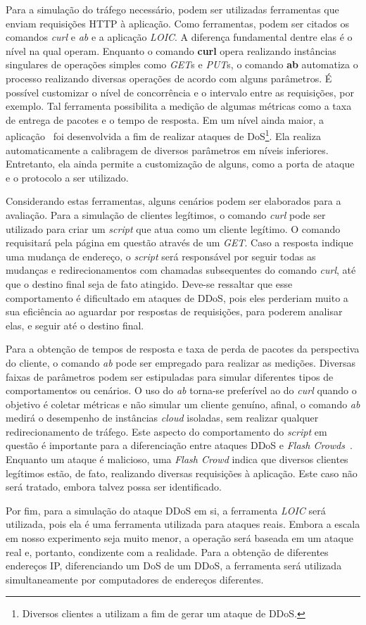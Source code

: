 
Para a simulação do tráfego necessário, podem ser utilizadas ferramentas que enviam requisições HTTP à aplicação. Como ferramentas, podem ser citados os comandos \emph{curl} e \emph{ab} e a aplicação \emph{LOIC}. A diferença fundamental dentre elas é o nível na qual operam. Enquanto o comando \textbf{curl} opera realizando instâncias singulares de operações simples como \emph{GET}s e \emph{PUT}s, o comando \textbf{ab} automatiza o processo realizando diversas operações de acordo com alguns parâmetros. É possível customizar o nível de concorrência e o intervalo entre as requisições, por exemplo. Tal ferramenta possibilita a medição de algumas métricas como a taxa de entrega de pacotes e o tempo de resposta. Em um nível ainda maior, a aplicação~\cite{loic} foi desenvolvida a fim de realizar ataques de DoS\footnote{Diversos clientes a utilizam a fim de gerar um ataque de DDoS.}. Ela realiza automaticamente a calibragem de diversos parâmetros em níveis inferiores. Entretanto, ela ainda permite a customização de alguns, como a porta de ataque e o protocolo a ser utilizado.

Considerando estas ferramentas, alguns cenários podem ser elaborados para a avaliação. 
%
Para a simulação de clientes legítimos, o comando \emph{curl} pode ser utilizado para criar um \emph{script} que atua como um cliente legítimo. O comando requisitará pela página em questão através de um \emph{GET}. Caso a resposta indique uma mudança de endereço, o \emph{script} será responsável por seguir todas as mudanças e redirecionamentos com chamadas subsequentes do comando \emph{curl}, até que o destino final seja de fato atingido. Deve-se ressaltar que esse comportamento é dificultado em ataques de DDoS, pois eles perderiam muito a sua eficiência ao aguardar por respostas de requisições, para poderem analisar elas, e seguir até o destino final.

Para a obtenção de tempos de resposta e taxa de perda de pacotes da perspectiva do cliente, o comando \emph{ab} pode ser empregado para realizar as medições. Diversas faixas de parâmetros podem ser estipuladas para simular diferentes tipos de comportamentos ou cenários. O uso do \emph{ab} torna-se preferível ao do \emph{curl} quando o objetivo é coletar métricas e não simular um cliente genuíno, afinal, o comando \emph{ab} medirá o desempenho de instâncias \emph{cloud} isoladas, sem realizar qualquer redirecionamento de tráfego. Este aspecto do comportamento do \emph{script} em questão é importante para a diferenciação entre ataques DDoS e \emph{Flash Crowds}~\cite{Thapngam:2011p27061}. Enquanto um ataque é malicioso, uma \emph{Flash Crowd} indica que diversos clientes legítimos estão, de fato, realizando diversas requisições à aplicação. Este caso não será tratado, embora talvez possa ser identificado.

Por fim, para a simulação do ataque DDoS em si, a ferramenta \emph{LOIC} será utilizada, pois ela é uma ferramenta utilizada para ataques reais. Embora a escala em nosso experimento seja muito menor, a operação será baseada em um ataque real e, portanto, condizente com a realidade. Para a obtenção de diferentes endereços IP, diferenciando um DoS de um DDoS, a ferramenta será utilizada simultaneamente por computadores de endereços diferentes.
